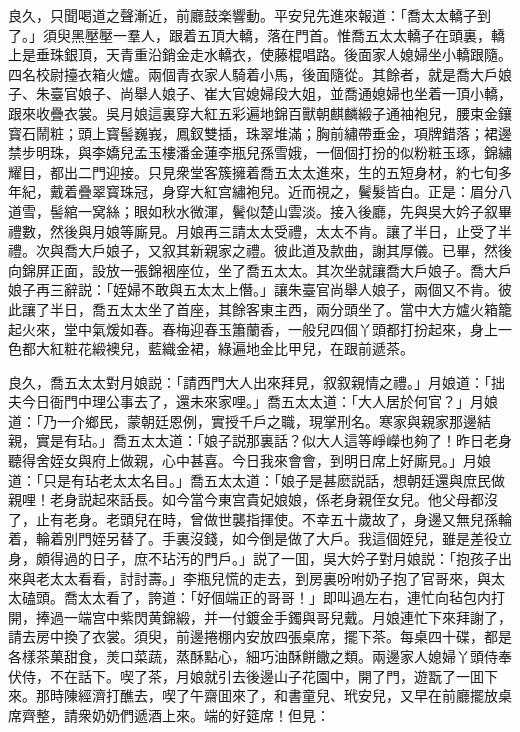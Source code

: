 良久，只聞喝道之聲漸近，前廳鼓楽響動。平安兒先進來報道：「喬太太轎子到了。」須臾黑壓壓一羣人，跟着五頂大轎，落在門首。惟喬五太太轎子在頭裏，轎上是垂珠銀頂，天青重沿銷金走水轎衣，使藤棍唱路。後面家人媳婦坐小轎跟隨。四名校尉擡衣箱火爐。兩個青衣家人騎着小馬，後面隨從。其餘者，就是喬大戶娘子、朱臺官娘子、尚舉人娘子、崔大官媳婦段大姐，並喬通媳婦也坐着一頂小轎，跟來收疊衣裳。吳月娘這裏穿大紅五彩遍地錦百獸朝麒麟緞子通袖袍兒，腰束金鑲寳石鬧粧；頭上寳髻巍峩，鳳釵雙插，珠翠堆滿；胸前繡帶垂金，項牌錯落；裙邊禁步明珠，與李嬌兒孟玉樓潘金蓮李瓶兒孫雪娥，一個個打扮的似粉粧玉琢，錦繡耀目，都出二門迎接。只見衆堂客簇擁着喬五太太進來，生的五短身材，約七旬多年紀，戴着疊翠寳珠冠，身穿大紅宫繡袍兒。近而視之，鬢髮皆白。正是：眉分八道雪，髻綰一窝絲；眼如秋水微渾，鬢似楚山雲淡。接入後廳，先與吳大妗子叙畢禮數，然後與月娘等廝見。月娘再三請太太受禮，太太不肯。讓了半日，止受了半禮。次與喬大戶娘子，又叙其新親家之禮。彼此道及款曲，謝其厚儀。已畢，然後向錦屏正面，設放一張錦裀座位，坐了喬五太太。其次坐就讓喬大戶娘子。喬大戶娘子再三辭説：「姪婦不敢與五太太上僭。」讓朱臺官尚舉人娘子，兩個又不肯。彼此讓了半日，喬五太太坐了首座，其餘客東主西，兩分頭坐了。當中大方爐火箱籠起火來，堂中氣煖如春。春梅迎春玉簫蘭香，一般兒四個丫頭都打扮起來，身上一色都大紅粧花緞襖兒，藍織金裙，綠遍地金比甲兒，在跟前遞茶。

良久，喬五太太對月娘説：「請西門大人出來拜見，叙叙親情之禮。」月娘道：「拙夫今日衙門中理公事去了，還未來家哩。」喬五太太道：「大人居於何官？」月娘道：「乃一介鄉民，蒙朝廷恩例，實授千戶之職，現掌刑名。寒家與親家那邊結親，實是有玷。」喬五太太道：「娘子説那裏話？似大人這等崢嶸也夠了！昨日老身聽得舍姪女與府上做親，心中甚喜。今日我來會會，到明日席上好廝見。」月娘道：「只是有玷老太太名目。」喬五太太道：「娘子是甚麽説話，想朝廷還與庶民做親哩！老身説起來話長。如今當今東宫貴妃娘娘，係老身親侄女兒。他父母都沒了，止有老身。老頭兒在時，曾做世襲指揮使。不幸五十歲故了，身邊又無兒孫輪着，輪着別門姪另替了。手裏沒錢，如今倒是做了大戶。我這個姪兒，雖是差役立身，頗得過的日子，庶不玷汚的門戶。」説了一囬，吳大妗子對月娘説：「抱孩子出來與老太太看看，討討壽。」李瓶兒慌的走去，到房裏吩咐奶子抱了官哥來，與太太磕頭。喬太太看了，誇道：「好個端正的哥哥！」即叫過左右，連忙向毡包内打開，捧過一端宫中紫閃黄錦緞，并一付鍍金手鐲與哥兒戴。月娘連忙下來拜謝了，請去房中換了衣裳。須臾，前邊捲棚内安放四張桌席，擺下茶。每桌四十碟，都是各樣茶菓甜食，羙口菜蔬，蒸酥點心，細巧油酥餅饊之類。兩邊家人媳婦丫頭侍奉伏侍，不在話下。喫了茶，月娘就引去後邊山子花園中，開了門，遊翫了一囬下來。那時陳經濟打醮去，喫了午齋囬來了，和書童兒、玳安兒，又早在前廳擺放桌席齊整，請衆奶奶們遞酒上來。端的好筵席！但見：

